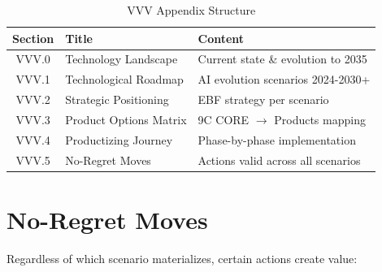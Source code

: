\begin{table}[htbp]
\centering
\caption{VVV Appendix Structure}
\label{tab:vvv-structure}
\renewcommand{\arraystretch}{1.3}
\begin{tabular}{@{}clp{8cm}@{}}
\toprule
\textbf{Section} & \textbf{Title} & \textbf{Content} \\
\midrule
VVV.0 & Technology Landscape & Current state \& evolution to 2035 \\
VVV.1 & Technological Roadmap & AI evolution scenarios 2024-2030+ \\
VVV.2 & Strategic Positioning & EBF strategy per scenario \\
VVV.3 & Product Options Matrix & 9C CORE $\to$ Products mapping \\
VVV.4 & Productizing Journey & Phase-by-phase implementation \\
VVV.5 & No-Regret Moves & Actions valid across all scenarios \\
\bottomrule
\end{tabular}
\end{table}










\section{No-Regret Moves}
\label{sec:vvv-no-regret}

Regardless of which scenario materializes, certain actions create value:

